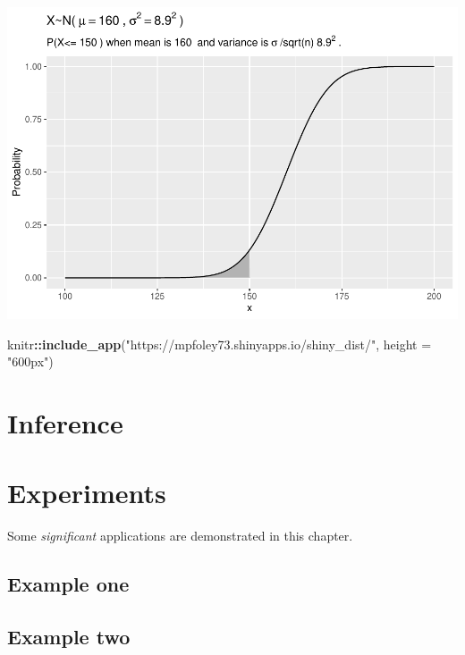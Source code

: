 \documentclass[]{book}
\newenvironment{Shaded}{\begin{snugshade}}{\end{snugshade}}
\newcommand{\DataTypeTok}[1]{\textcolor[rgb]{0.13,0.29,0.53}{#1}}
\newcommand{\KeywordTok}[1]{\textcolor[rgb]{0.13,0.29,0.53}{\textbf{#1}}}
\newcommand{\NormalTok}[1]{#1}
\newcommand{\OperatorTok}[1]{\textcolor[rgb]{0.81,0.36,0.00}{\textbf{#1}}}
\newcommand{\StringTok}[1]{\textcolor[rgb]{0.31,0.60,0.02}{#1}}
\begin{document}
\includegraphics{data-sci_files/figure-latex/unnamed-chunk-19-1.pdf}

\begin{Shaded}
\begin{Highlighting}[]
\NormalTok{knitr}\OperatorTok{::}\KeywordTok{include_app}\NormalTok{(}\StringTok{"https://mpfoley73.shinyapps.io/shiny_dist/"}\NormalTok{, }
  \DataTypeTok{height =} \StringTok{"600px"}\NormalTok{)}
\end{Highlighting}
\end{Shaded}

\hypertarget{inference}{%
\chapter{Inference}\label{inference}}

\hypertarget{experiments}{%
\chapter{Experiments}\label{experiments}}

Some \emph{significant} applications are demonstrated in this chapter.

\hypertarget{example-one}{%
\section{Example one}\label{example-one}}

\hypertarget{example-two}{%
\section{Example two}\label{example-two}}
\end{document}
